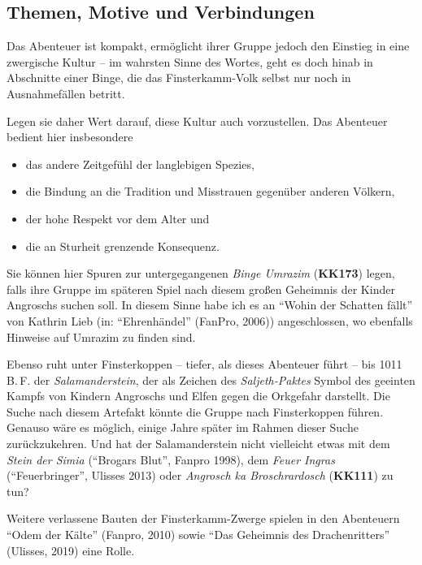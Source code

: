 \documentclass[openright]{Ilaris}
\newcommand{\fkv}{Finsterkamm-Volk }
\begin{document}
\subsection{Themen, Motive und Verbindungen}
Das Abenteuer ist kompakt, ermöglicht  ihrer Gruppe jedoch den Einstieg in eine zwergische Kultur -- im wahrsten Sinne des Wortes, geht es doch hinab in Abschnitte einer Binge,
die das \fkv selbst nur noch in  Ausnahmefällen betritt.


Legen sie daher Wert darauf, diese Kultur auch vorzustellen. Das Abenteuer bedient hier insbesondere
\begin{itemize}
	\item das andere Zeitgefühl der langlebigen Spezies,
	\item die Bindung an die Tradition und Misstrauen gegenüber anderen Völkern,
	\item der hohe Respekt vor dem Alter und
	\item die an Sturheit grenzende Konsequenz.
\end{itemize}

Sie können hier  Spuren zur untergegangenen \emph{Binge Umrazim} (\textbf{KK173}) legen,
falls ihre Gruppe im späteren Spiel nach diesem großen Geheimnis der Kinder Angroschs suchen soll.
In diesem Sinne habe ich es an \enquote{Wohin der Schatten fällt} von Kathrin Lieb (in: \enquote{Ehrenhändel} (FanPro, 2006)) angeschlossen, wo ebenfalls Hinweise auf Umrazim zu finden sind.

Ebenso ruht unter Finsterkoppen -- tiefer, als dieses Abenteuer führt -- bis 1011 B.\,F. der \emph{Salamanderstein}, der als Zeichen des \emph{Saljeth-Paktes} Symbol des geeinten Kampfs von Kindern Angroschs und Elfen gegen die Orkgefahr darstellt.
Die Suche nach diesem Artefakt könnte die Gruppe nach Finsterkoppen führen.
Genauso wäre es möglich, einige Jahre später im Rahmen dieser Suche zurückzukehren.
Und hat der Salamanderstein nicht vielleicht etwas mit dem \emph{Stein der Simia} (\enquote{Brogars Blut}, Fanpro 1998), dem \emph{Feuer Ingras} (\enquote{Feuerbringer}, Ulisses 2013) oder \emph{Angrosch ka Broschrardosch} (\textbf{KK111}) zu tun?

Weitere verlassene Bauten der Finsterkamm-Zwerge spielen in den Abenteuern \enquote{Odem der Kälte} (Fanpro, 2010) sowie \enquote{Das Geheimnis des Drachenritters} (Ulisses, 2019) eine Rolle.
\spaltenende
\end{document}
